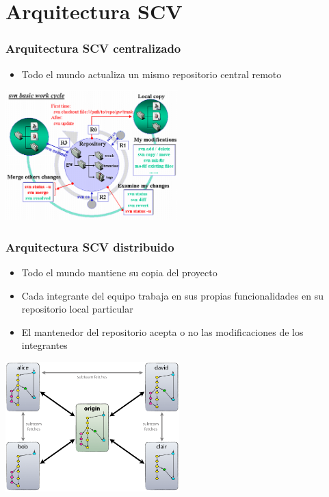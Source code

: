\section{Arquitectura SCV}
\frame
{
\frametitle{Arquitectura SCV centralizado}
\begin{itemize}
 \item Todo el mundo actualiza un mismo repositorio central remoto
\end{itemize}

\begin{center}
 \includegraphics[height=5cm]{imgs/svnscheme.png}
\end{center}
}

\frame
{
\frametitle{Arquitectura SCV distribuido}
\begin{itemize}
 \item Todo el mundo mantiene su copia del proyecto
 \item Cada integrante del equipo trabaja en sus propias funcionalidades en su repositorio local particular
 \item El mantenedor del repositorio acepta o no las modificaciones de los integrantes
\end{itemize}

\begin{center}
 \includegraphics[height=5cm]{imgs/gitscheme.png}
\end{center}
}

